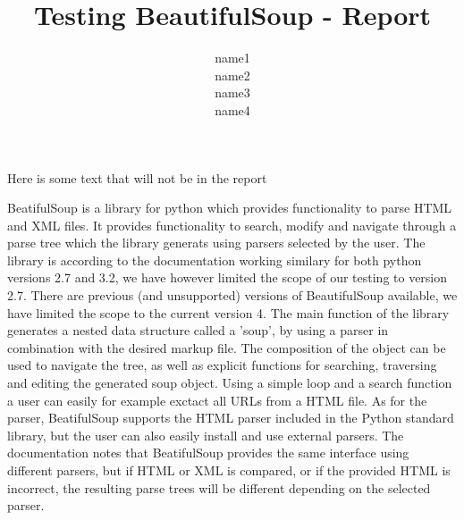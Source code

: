 \documentclass[10pt]{article}
\title{Testing BeautifulSoup - Report}
\author{name1 \\ name2 \\ name3 \\ name4}
\begin{document}
\maketitle

Here is some text that will not be in the report \\

\begin{Description of BeautifulSoup4}
 BeatifulSoup is a library for python which provides functionality to parse HTML and XML files. It provides functionality to search, modify and navigate through a parse tree which the library generats using parsers selected by the user. The library is according to the documentation working similary for both python versions 2.7 and 3.2, we have however limited the scope of our testing to version 2.7. There are previous (and unsupported) versions of BeautifulSoup available, we have limited the scope to the current version 4. The main function of the library generates a nested data structure called a 'soup', by using a parser in combination with the desired markup file. The composition of the object can be used to navigate the tree, as well as explicit functions for searching, traversing and editing the generated soup object. Using a simple loop and a search function a user can easily for example exctact all URLs from a HTML file.
As for the parser, BeatifulSoup supports the HTML parser included in the Python standard library, but the user can also easily install and use external parsers. The documentation notes that BeatifulSoup provides the same interface using different parsers, but if HTML or XML is compared, or if the provided HTML is incorrect, the resulting parse trees will be different depending on the selected parser.
\end{Description of BeautifulSoup4}
\end{document}
